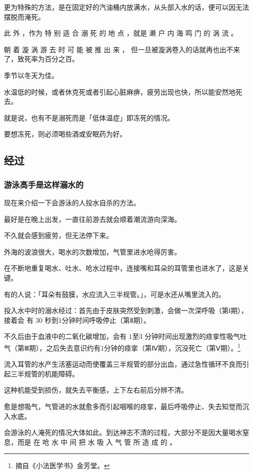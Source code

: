\documentclass[UTF8]{ctexart}
\begin{document}
更为特殊的方法，是在固定好的汽油桶内放满水，从头部入水的话，便可以因无法摆脱而淹死。

此 外 ，作为 特 别 适 合 溺 死 的 地 点 ，就是 濑 户 内 海 鸣 门 的 涡 流 。

朝 着 漩 涡 游 去 时 可 能 被 推 出 来 ， 但一旦被漩涡卷入的话就再也出不来了，致死率为百分之百。

季节以冬天为佳。

水温低的时候，或者休克死或者引起心脏麻痹，疲劳出现也快，所以能安然地死去。

就是说，也有不是溺死而是「低体温症」即冻死的情况。

要想冻死，则必须喝些酒或安眠药为好。

\subsection{经过}

\subsubsection*{游泳高手是这样溺水的}

现在来介绍一下会游泳的人投水自杀的方法。

最好是在晚上出发，一直往前游去就会顺着潮流游向深海。

不久就会感到疲劳，但无法停下来。

外海的波浪很大，喝水的次数增加，气管里进水呛得厉害。

在不断地重复喝水、吐水、呛水过程中，连接嘴和耳朵的耳管里也进水了，这是关键。

有的人说：「耳朵有鼓膜，水应流入三半规管。」，可是水还从嘴里流入的。

投入水中时的溺水经过：首先由于皮肤突然受到刺激，会做一次深呼吸（第Ⅰ期），接着会 有 $30$ 秒到$1$分钟时间呼吸停止（第Ⅱ期）。

不久后由于血液中的二氧化碳增加，会有 $1$至$3$ 分钟时间出现激烈的痉挛性吸气吐气（第Ⅲ期），之后失去意识约有$1$分钟的痉挛（第Ⅳ期），沉没死亡（第Ⅴ期）。\footnote{摘自《小法医学书》金芳堂。}

流入耳管的水产生活塞运动而使覆盖三半规管的部分出血，通过急性循环不良而引起三半规管的机能障碍。

这种机能受到损伤，就失去平衡感，上下左右前后分辨不清。

愈是想吸气，气管进的水就愈多而引起咽喉的痉挛，最后呼吸停止、失去知觉而沉入水底。

会游泳的人淹死的情况大体如此。到达神志不清的过程，大部分不是因大量喝水窒息，而是 在 呛 水 中 间 把 水 吸 入 气 管 所 造 成 的 。
\end{document}
